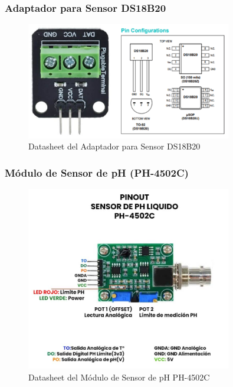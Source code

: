 \documentclass[a4paper,12pt]{article}
\begin{document}
	\subsubsection{Adaptador para Sensor DS18B20}
	\begin{figure}[H]
		\centering
		\includegraphics[width=0.8\textwidth]{adaptador.png}
		\caption{Datasheet del Adaptador para Sensor DS18B20}
		\label{fig:adaptador_ds18b20_datasheet}
	\end{figure}
	
	\subsubsection{Módulo de Sensor de pH (PH-4502C)}
	\begin{figure}[H]
		\centering
		\includegraphics[width=0.8\textwidth]{ph.png}
		\caption{Datasheet del Módulo de Sensor de pH PH-4502C}
		\label{fig:ph_datasheet}
	\end{figure}
	
\end{document}

